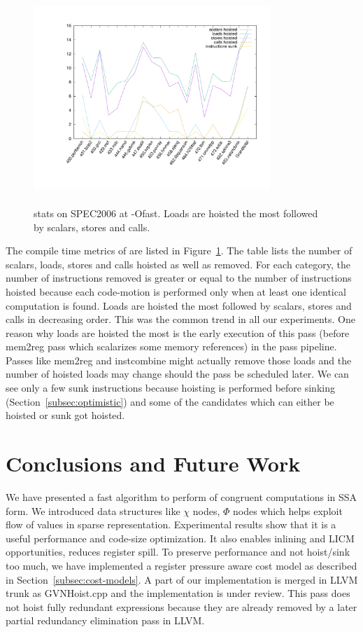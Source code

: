 \documentclass[sigplan,10pt,review,anonymous]{acmart}\settopmatter{printfolios=true,printccs=false,printacmref=false}
\begin{document}
\begin{figure}[h!]
  \includegraphics[width=0.8\textwidth,height=8cm]{gcm-stats.pdf}
  \vspace*{-1.5cm}
\caption{\GCM{} stats on SPEC2006 at -Ofast. Loads are hoisted the most followed
  by scalars, stores and calls.}
\label{tab:code-motion-metric}
\end{figure}

The compile time metrics of \GCM{} are listed in
Figure~\ref{tab:code-motion-metric}. The table lists the number of scalars,
loads, stores and calls hoisted as well as removed. For each category, the
number of instructions removed is greater or equal to the number of instructions
hoisted because each code-motion is performed only when at least one identical
computation is found. Loads are hoisted the most followed by scalars, stores and
calls in decreasing order.  This was the common trend in all our
experiments. One reason why loads are hoisted the most is the early execution of
this pass (before mem2reg pass which scalarizes some memory references) in the
\LLVM{} pass pipeline. Passes like mem2reg and instcombine might actually remove
those loads and the number of hoisted loads may change should the \GCM{} pass be
scheduled later. We can see only a few sunk instructions because hoisting is
performed before sinking (Section~\ref{subsec:optimistic}) and some of the
candidates which can either be hoisted or sunk got hoisted.

\section{Conclusions and Future Work}
\label{sec:future-work}
We have presented a fast algorithm to perform \gcm{} of congruent computations
in SSA form. We introduced data structures like $\chi$ nodes, $\Phi$ nodes which
helps exploit flow of values in sparse representation.  Experimental results
show that it is a useful performance and code-size optimization. It also enables
inlining and LICM opportunities, reduces register spill. To preserve performance
and not hoist/sink too much, we have implemented a register pressure aware cost
model as described in Section~\ref{subsec:cost-models}. A part of our
implementation is merged in LLVM trunk as GVNHoist.cpp and the \GCM{}
implementation is under review. This pass does not hoist fully redundant
expressions because they are already removed by a later partial redundancy
elimination pass in LLVM.
\end{document}
